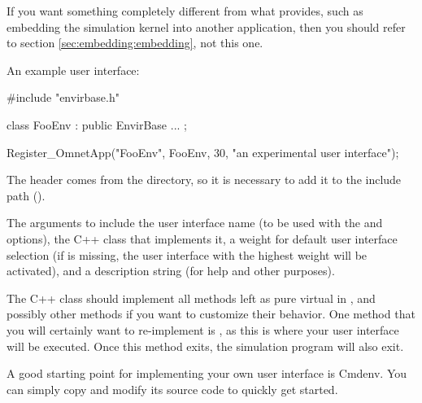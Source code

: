 \begin{note}
If you want something completely different from what 
provides, such as embedding the simulation kernel into another application, then
you should refer to section \ref{sec:embedding:embedding}, not this one.
\end{note}

An example user interface:

\begin{cpp}
#include "envirbase.h"

class FooEnv : public EnvirBase
{
    ...
};

Register_OmnetApp("FooEnv", FooEnv, 30, "an experimental user interface");
\end{cpp}

The  header comes from the  directory, so
it is necessary to add it to the include path ().

The arguments to  include the user interface name (to
be used with the  and  options), the C++ class
that implements it, a weight for default user interface selection (if 
is missing, the user interface with the highest weight will be activated), and a
description string (for help and other purposes).

The C++ class should implement all methods left as pure virtual in
, and possibly other methods if you want to customize their
behavior. One method that you will certainly want to re-implement is
, as this is where your user interface will be executed. Once this
method exits, the simulation program will also exit.

\begin{note}
A good starting point for implementing your own user interface is Cmdenv. You
can simply copy and modify its source code to quickly get started.
\end{note}


